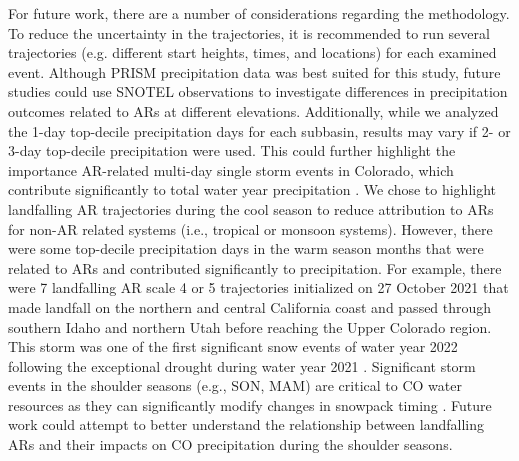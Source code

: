 \documentclass[draft]{agujournal2019}
\begin{document}
For future work, there are a number of considerations regarding the methodology. To reduce the uncertainty in the trajectories, it is recommended to run several trajectories (e.g. different start heights, times, and locations) for each examined event. Although PRISM precipitation data was best suited for this study, future studies could use SNOTEL observations to investigate differences in precipitation outcomes related to ARs at different elevations. Additionally, while we analyzed the 1-day top-decile precipitation days for each subbasin, results may vary if 2- or 3-day top-decile precipitation were used. This could further highlight the importance AR-related multi-day single storm events in Colorado, which contribute significantly to total water year precipitation \cite{Cowie1986ColoradoAnalysis, Kirk2018LargeBasin, Lute2014RoleStates, Mahoney2015ClimatologyVariability, Serreze2001CharacteristicsData}. We chose to highlight landfalling AR trajectories during the cool season to reduce attribution to ARs for non-AR related systems (i.e., tropical or monsoon systems). However, there were some top-decile precipitation days in the warm season months that were related to ARs and contributed significantly to precipitation. For example, there were 7 landfalling AR scale 4 or 5 trajectories initialized on 27 October 2021 that made landfall on the northern and central California coast and passed through southern Idaho and northern Utah before reaching the Upper Colorado region. This storm was one of the first significant snow events of water year 2022 following the exceptional drought during water year 2021 \cite{Bolinger2024ClimateEdition}. Significant storm events in the shoulder seasons (e.g., SON, MAM) are critical to CO water resources as they can significantly modify changes in snowpack timing \cite{Heldmyer2023ABasin}. Future work could attempt to better understand the relationship between landfalling ARs and their impacts on CO precipitation during the shoulder seasons.


\end{document}
